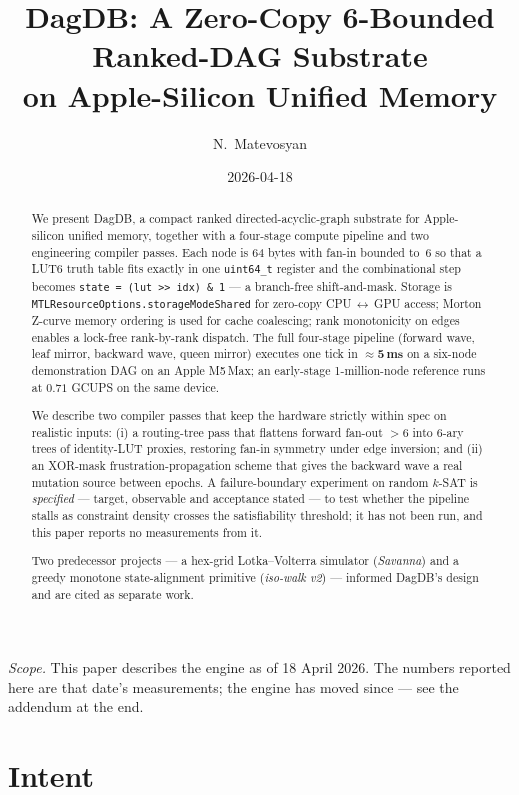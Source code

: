 \documentclass[11pt]{article}
\title{DagDB: A Zero-Copy 6-Bounded Ranked-DAG Substrate\\
on Apple-Silicon Unified Memory}
\author{N.\ Matevosyan}
\date{2026-04-18}
\begin{document}
\maketitle

\noindent\textit{Scope.} This paper describes the engine as of 18
April 2026. The numbers reported here are that date's measurements;
the engine has moved since --- see the addendum at the end.

\begin{abstract}
We present DagDB, a compact ranked directed-acyclic-graph substrate
for Apple-silicon unified memory, together with a four-stage compute
pipeline and two engineering compiler passes. Each node is 64 bytes
with fan-in bounded to~6 so that a LUT6 truth table fits exactly in
one \texttt{uint64\_t} register and the combinational step becomes
\texttt{state\,=\,(lut\,>>\,idx)\,\&\,1} --- a branch-free
shift-and-mask. Storage is \texttt{MTLResourceOptions.storageModeShared}
for zero-copy CPU\,$\leftrightarrow$\,GPU access; Morton Z-curve memory ordering is
used for cache coalescing; rank monotonicity on edges enables a
lock-free rank-by-rank dispatch. The full four-stage pipeline
(forward wave, leaf mirror, backward wave, queen mirror) executes one
tick in $\approx\mathbf{5\,\text{ms}}$ on a six-node demonstration
DAG on an Apple M5\,Max; an early-stage 1-million-node reference
runs at $\mathbf{0.71}$ GCUPS on the same device.

We describe two compiler passes that keep the hardware strictly
within spec on realistic inputs: (i) a routing-tree pass that
flattens forward fan-out $>6$ into 6-ary trees of identity-LUT
proxies, restoring fan-in symmetry under edge inversion; and (ii) an
XOR-mask frustration-propagation scheme that gives the backward wave
a real mutation source between epochs. A failure-boundary experiment
on random $k$-SAT is \emph{specified} --- target, observable and
acceptance stated --- to test whether the pipeline stalls as constraint
density crosses the satisfiability threshold; it has not been run, and
this paper reports no measurements from it.

Two predecessor projects --- a hex-grid Lotka--Volterra simulator
(\emph{Savanna}) and a greedy monotone state-alignment primitive
(\emph{iso-walk v2}) --- informed DagDB's design and are cited as
separate work.
\end{abstract}

\section{Intent}
\label{sec:intent}
\end{document}
